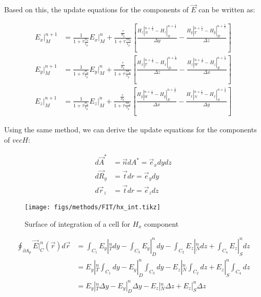     Based on this, the update equations for the components of $\vec{E}$ can be written as:

    \begin{align}
        E_x|_M^{n+1} &= \frac{1}{1+\tau\frac{\sigma_p}{\epsilon_p}}E_x|_M^n
            + \frac{\frac{\tau}{\sigma_p}}{1+\tau\frac{\tau\sigma_p}{\epsilon_p}}\left[\frac{H_z|_N^{n+\frac{1}{2}}-H_z|_S^{n+\frac{1}{2}}}{\Delta y}
            - \frac{H_y|_T^{n+\frac{1}{2}} - H_y|_D^{n+\frac{1}{2}}}{\Delta z}\right]\\
        E_y|_M^{n+1} &= \frac{1}{1+\tau\frac{\sigma_p}{\epsilon_p}}E_y|_M^n
            + \frac{\frac{\tau}{\sigma_p}}{1+\tau\frac{\tau\sigma_p}{\epsilon_p}}\left[\frac{H_x|_T^{n+\frac{1}{2}}-H_x|_D^{n+\frac{1}{2}}}{\Delta z}
            - \frac{H_z|_W^{n+\frac{1}{2}} - H_z|_E^{n+\frac{1}{2}}}{\Delta x}\right]\\
        E_z|_M^{n+1} &= \frac{1}{1+\tau\frac{\sigma_p}{\epsilon_p}}E_z|_M^n
            + \frac{\frac{\tau}{\sigma_p}}{1+\tau\frac{\tau\sigma_p}{\epsilon_p}}\left[\frac{H_y|_W^{n+\frac{1}{2}}-H_y|_E^{n+\frac{1}{2}}}{\Delta x}
            - \frac{H_x|_N^{n+\frac{1}{2}} - H_x|_S^{n+\frac{1}{2}}}{\Delta y}\right]
    \end{align}

    Using the same method, we can derive the update equations for the components of $vec{H}$:

    \begin{align}
        d\vec{A}^* &= \vec{n}dA^* = \vec{e}_xdydz \\
        d\vec{R}_y &= \vec{t}dr = \vec{e}_ydy \\
        d\vec{r}_z &= \vec{t}dr = \vec{e}_zdz
    \end{align}

    \begin{figure}
        \centering
        \texttt{[image: figs/methods/FIT/hx\_int.tikz]}
        \caption{Surface of integration of a cell for $H_x$ component}
        \label{fig:Hx_Int}
    \end{figure}


    \begin{align}
        \oint_{\partial A_p} \vec{E}|_{C}^{n}(\vec{r})d\vec{r} &= \int_{C_1}E_y|_{T}^ndy
                - \int_{C_3}E_y|_{D}^{n}dy - \int_{C_2}E_z|_{N}^{n}dz + \int_{C_4}E_z|_S^ndz \\
                &= E_y|_T^n\int_{C_1}dy - E_y|_D^n\int_{C_3}dy - E_z|_N^n\int_{C_2}dz + E_z|_S^n\int_{C_4}dz\\
                &= E_y|_T^n\Delta y - E_y|_D^n\Delta y - E_z|_N^n \Delta z + E_z|_S^n \Delta z
    \end{align}

